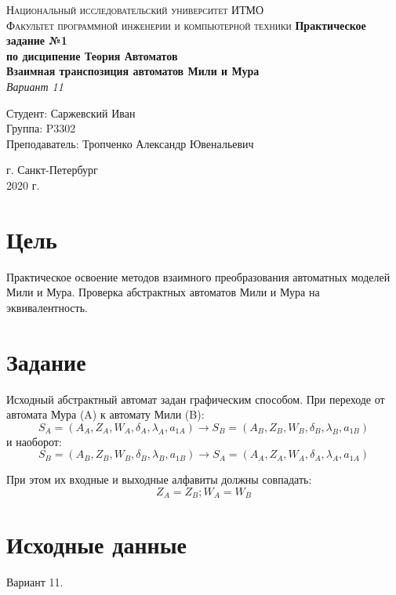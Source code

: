 \documentclass[12pt, a4paper]{article}
\begin{document}
\begin{titlepage}
\begin{center}

\textsc{Национальный исследовательский университет ИТМО\\[4mm]
Факультет программной инженерии и компьютерной техники}
\vfill
\textbf{Практическое задание №1\\[4mm]
по дисципение Теория Автоматов\\[4mm]
Взаимная транспозиция автоматов Мили и Мура\\[4mm]
}
\textit{Вариант 11\\[16mm]}
\begin{flushright}
Студент: Саржевский Иван
\\[2mm]Группа: P3302
\\[2mm]Преподаватель: Тропченко Александр Ювенальевич
\end{flushright}
\vfill
г. Санкт-Петербург\\[2mm]
2020 г.

\end{center}
\end{titlepage}

\section*{Цель}

Практическое освоение методов взаимного преобразования автоматных моделей
Мили и Мура. Проверка абстрактных автоматов Мили и Мура на эквивалентность.

\section*{Задание}

Исходный абстрактный автомат задан графическим способом. При переходе от
автомата Мура (A) к автомату Мили (B):
$$S_A = (A_A, Z_A, W_A, \delta_A, \lambda_A, a_{1A}) \to S_B = (A_B, Z_B, W_B, \delta_B, \lambda_B, a_{1B})$$
и наоборот:
$$S_B = (A_B, Z_B, W_B, \delta_B, \lambda_B, a_{1B}) \to S_A = (A_A, Z_A, W_A, \delta_A, \lambda_A, a_{1A})$$

При этом их входные и выходные алфавиты должны совпадать:
$$Z_A = Z_B; W_A = W_B$$

\section*{Исходные данные}

Вариант 11.
\end{document}
